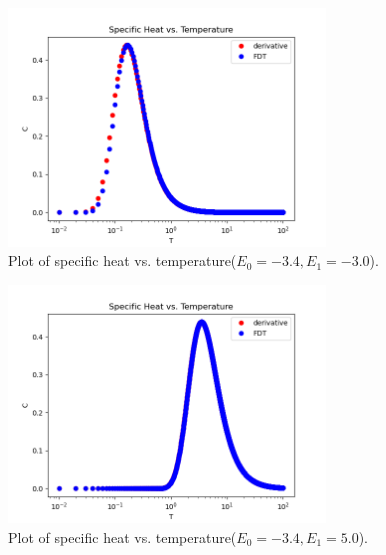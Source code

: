 \documentclass{article}
\begin{document}
\begin{figure}[!htb]
    \centering
    \includegraphics[width=0.75\textwidth]{../code/phy112l_lab1/1-12a.png}
    \caption{Plot of specific heat vs. temperature($E_0 = -3.4, E_1 = -3.0$).}
    \label{fig:fig4}
\end{figure}
\begin{figure}[!htb]
    \centering
    \includegraphics[width=0.75\textwidth]{../code/phy112l_lab1/1-12b.png}
    \caption{Plot of specific heat vs. temperature($E_0 = -3.4, E_1 = 5.0$).}
    \label{fig:fig5}
\end{figure}
\end{document}
